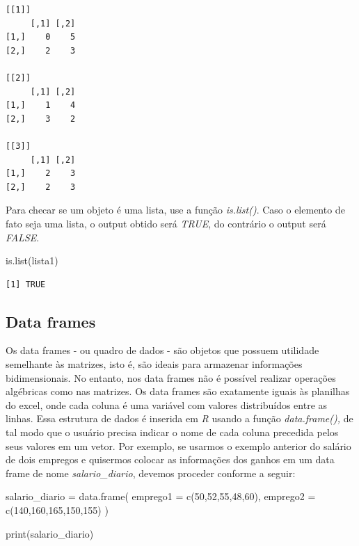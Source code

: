 \documentclass[
  letterpaper,
  DIV=11,
  numbers=noendperiod]{scrreprt}
\newenvironment{Shaded}{\begin{snugshade}}{\end{snugshade}}
\newcommand{\AttributeTok}[1]{\textcolor[rgb]{0.40,0.45,0.13}{#1}}
\newcommand{\DecValTok}[1]{\textcolor[rgb]{0.68,0.00,0.00}{#1}}
\newcommand{\FunctionTok}[1]{\textcolor[rgb]{0.28,0.35,0.67}{#1}}
\newcommand{\NormalTok}[1]{\textcolor[rgb]{0.00,0.23,0.31}{#1}}
\newcommand{\OtherTok}[1]{\textcolor[rgb]{0.00,0.23,0.31}{#1}}
\begin{document}
\begin{verbatim}
[[1]]
     [,1] [,2]
[1,]    0    5
[2,]    2    3

[[2]]
     [,1] [,2]
[1,]    1    4
[2,]    3    2

[[3]]
     [,1] [,2]
[1,]    2    3
[2,]    2    3
\end{verbatim}

Para checar se um objeto é uma lista, use a função \emph{is.list()}.
Caso o elemento de fato seja uma lista, o output obtido será
\emph{TRUE}, do contrário o output será \emph{FALSE}.

\begin{Shaded}
\begin{Highlighting}[]
\FunctionTok{is.list}\NormalTok{(lista1)}
\end{Highlighting}
\end{Shaded}

\begin{verbatim}
[1] TRUE
\end{verbatim}

\subsection{Data frames}\label{data-frames}

Os data frames - ou quadro de dados - são objetos que possuem utilidade
semelhante às matrizes, isto é, são ideais para armazenar informações
bidimensionais. No entanto, nos data frames não é possível realizar
operações algébricas como nas matrizes. Os data frames são exatamente
iguais às planilhas do excel, onde cada coluna é uma variável com
valores distribuídos entre as linhas. Essa estrutura de dados é inserida
em \emph{R} usando a função \emph{data.frame(),} de tal modo que o
usuário precisa indicar o nome de cada coluna precedida pelos seus
valores em um vetor. Por exemplo, se usarmos o exemplo anterior do
salário de dois empregos e quisermos colocar as informações dos ganhos
em um data frame de nome \emph{salario\_diario}, devemos proceder
conforme a seguir:

\begin{Shaded}
\begin{Highlighting}[]
\NormalTok{salario\_diario }\OtherTok{=} \FunctionTok{data.frame}\NormalTok{(}
  \AttributeTok{emprego1 =} \FunctionTok{c}\NormalTok{(}\DecValTok{50}\NormalTok{,}\DecValTok{52}\NormalTok{,}\DecValTok{55}\NormalTok{,}\DecValTok{48}\NormalTok{,}\DecValTok{60}\NormalTok{),}
  \AttributeTok{emprego2 =} \FunctionTok{c}\NormalTok{(}\DecValTok{140}\NormalTok{,}\DecValTok{160}\NormalTok{,}\DecValTok{165}\NormalTok{,}\DecValTok{150}\NormalTok{,}\DecValTok{155}\NormalTok{)}
\NormalTok{)}

\FunctionTok{print}\NormalTok{(salario\_diario)}
\end{Highlighting}
\end{Shaded}
\end{document}
